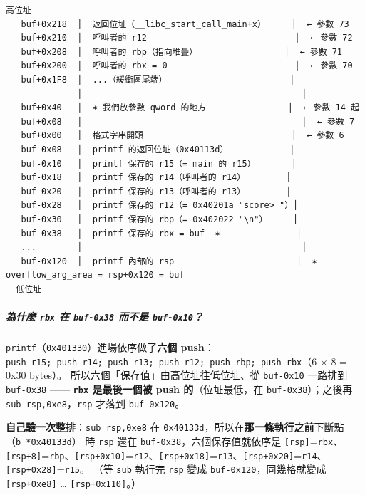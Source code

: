 \documentclass[10pt,a4paper]{article}
\renewenvironment{quote}{%
  \begin{mdframed}[linewidth=0pt,innerleftmargin=0pt,innerrightmargin=0pt,
    innerbottommargin=0pt,innertopmargin=0pt,skipabove=0.55em,skipbelow=0.55em,
    leftmargin=0.9em,rightmargin=0.4em,startcode={\color{quotebar}\vrule width 2.6pt},%
    endcode={}]%
  \itshape\color{black}%
}{%
  \end{mdframed}%
}
\begin{document}
\begin{Verbatim}[breaklines=true,breakanywhere=true,breakautoindent=false,fontsize=\fontsize{7.0}{9.5}\selectfont]
  高位址
   buf+0x218  │  返回位址（__libc_start_call_main+x）     │  ← 參數 73
   buf+0x210  │  呼叫者的 r12                             │  ← 參數 72
   buf+0x208  │  呼叫者的 rbp（指向堆疊）                 │  ← 參數 71
   buf+0x200  │  呼叫者的 rbx = 0                         │  ← 參數 70
   buf+0x1F8  │  ...（緩衝區尾端）                        │
              │                                           │
   buf+0x40   │  ✶ 我們放參數 qword 的地方                │  ← 參數 14 起
   buf+0x08   │                                           │  ← 參數 7
   buf+0x00   │  格式字串開頭                             │  ← 參數 6
   buf-0x08   │  printf 的返回位址（0x40113d）            │
   buf-0x10   │  printf 保存的 r15（= main 的 r15）       │
   buf-0x18   │  printf 保存的 r14（呼叫者的 r14）        │
   buf-0x20   │  printf 保存的 r13（呼叫者的 r13）        │
   buf-0x28   │  printf 保存的 r12（= 0x40201a "score> "）│
   buf-0x30   │  printf 保存的 rbp（= 0x402022 "\n"）     │
   buf-0x38   │  printf 保存的 rbx = buf  ✶               │
   ...        │                                           │
   buf-0x120  │  printf 內部的 rsp                        │  ✶ overflow_arg_area = rsp+0x120 = buf
  低位址
\end{Verbatim}

\subparagraph{\texorpdfstring{為什麼 \texttt{rbx} 在 \texttt{buf-\allowbreak{}0x38}
而不是
\texttt{buf-\allowbreak{}0x10}？}{為什麼 rbx 在 buf-0x38 而不是 buf-0x10？}}\label{ux70baux4ec0ux9ebc-rbx-ux5728-buf-0x38-ux800cux4e0dux662f-buf-0x10}

\texttt{printf}（\texttt{0x401330}）進場依序做了\textbf{六個 push}：
\texttt{push\ \allowbreak{}r15;\ \allowbreak{}push\ \allowbreak{}r14;\ \allowbreak{}push\ \allowbreak{}r13;\ \allowbreak{}push\ \allowbreak{}r12;\ \allowbreak{}push\ \allowbreak{}rbp;\ \allowbreak{}push\ \allowbreak{}rbx}（6
× 8 = 0x30 bytes）。 所以六個「保存值」由高位址往低位址、從
\texttt{buf-\allowbreak{}0x10} 一路排到 \texttt{buf-\allowbreak{}0x38} ------ \textbf{\texttt{rbx}
是最後一個被 push 的}（位址最低，在 \texttt{buf-\allowbreak{}0x38}）；之後再
\texttt{sub\ \allowbreak{}rsp,\allowbreak{}0xe8}，\texttt{rsp} 才落到 \texttt{buf-\allowbreak{}0x120}。

\begin{quote}
\textbf{自己驗一次整排}：\texttt{sub\ \allowbreak{}rsp,\allowbreak{}0xe8} 在
\texttt{0x40133d}，所以在\textbf{那一條執行之前}下斷點（\texttt{b\ \allowbreak{}*0x40133d}）
時 \texttt{rsp} 還在 \texttt{buf-\allowbreak{}0x38}，六個保存值就依序是
\texttt{{[}rsp{]}}=\texttt{rbx}、\texttt{{[}rsp+8{]}}=\texttt{rbp}、\texttt{{[}rsp+0x10{]}}=\texttt{r12}、\texttt{{[}rsp+0x18{]}}=\texttt{r13}、\texttt{{[}rsp+0x20{]}}=\texttt{r14}、\texttt{{[}rsp+0x28{]}}=\texttt{r15}。
（等 \texttt{sub} 執行完 \texttt{rsp} 變成
\texttt{buf-\allowbreak{}0x120}，同幾格就變成 \texttt{{[}rsp+0xe8{]}} \ldots{}
\texttt{{[}rsp+0x110{]}}。）
\end{quote}
\end{document}
